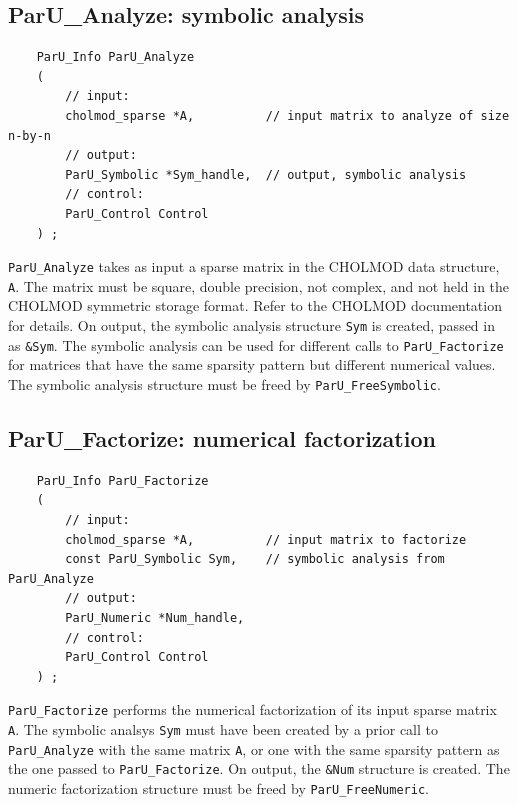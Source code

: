 \documentclass[12pt]{article}
\begin{document}
\subsection{{\sf ParU\_Analyze}: symbolic analysis}

    {\footnotesize
    \begin{verbatim}
    ParU_Info ParU_Analyze
    (
        // input:
        cholmod_sparse *A,          // input matrix to analyze of size n-by-n
        // output:
        ParU_Symbolic *Sym_handle,  // output, symbolic analysis
        // control:
        ParU_Control Control
    ) ; \end{verbatim}}

    \verb'ParU_Analyze' takes as input a sparse matrix in the CHOLMOD data
    structure, \verb'A'.  The matrix must be square, double precision, not
    complex, and not held in the CHOLMOD symmetric storage format.  Refer to
    the CHOLMOD documentation for details.  On output, the symbolic analysis
    structure \verb'Sym' is created, passed in as \verb'&Sym'.  The symbolic
    analysis can be used for different calls to \verb'ParU_Factorize' for
    matrices that have the same sparsity pattern but different numerical
    values.  The symbolic analysis structure must be freed by
    \verb'ParU_FreeSymbolic'.

\subsection{{\sf ParU\_Factorize}: numerical factorization}

    {\footnotesize
    \begin{verbatim}
    ParU_Info ParU_Factorize
    (
        // input:
        cholmod_sparse *A,          // input matrix to factorize
        const ParU_Symbolic Sym,    // symbolic analysis from ParU_Analyze
        // output:
        ParU_Numeric *Num_handle,
        // control:
        ParU_Control Control
    ) ; \end{verbatim}}

    \verb'ParU_Factorize' performs the numerical factorization of its input
    sparse matrix \verb'A'.  The symbolic analsys \verb'Sym' must have been
    created by a prior call to \verb'ParU_Analyze' with the same matrix
    \verb'A', or one with the same sparsity pattern as the one passed to
    \verb'ParU_Factorize'.  On output, the \verb'&Num' structure is created.
    The numeric factorization structure must be freed by
    \verb'ParU_FreeNumeric'.
\end{document}
